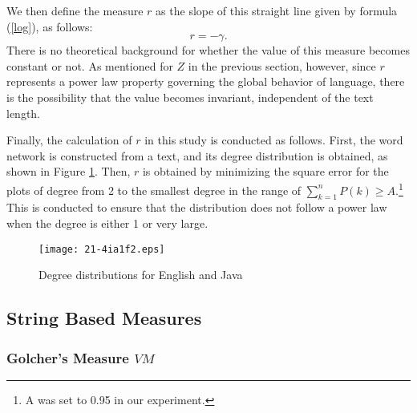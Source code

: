 \documentclass[english]{jnlp_1.4_rep}
\begin{document}
We then define the measure $r$ as the slope of this straight line given by formula (\ref{log}), as follows: 
\begin{equation}
r=-\gamma .           \label {eqr}
\end{equation}
There is no theoretical background for whether the value of this measure becomes constant or not. As mentioned for $Z$ in the previous section, however, since $r$ represents a power law property governing the global behavior of language, there is the possibility that the value becomes invariant,  
independent of the text length.

Finally, the calculation of $r$ in this study is conducted as follows. First, the word network is constructed from a text, and its degree distribution is obtained, as shown in Figure \ref{fig:deg}. Then, $r$ is obtained by minimizing the square error for the plots of degree from 2 to the smallest degree in the range of $\sum_{k=1}^{n}P(k)\geq A$.\footnote{A was set to 0.95 in our experiment.} This is conducted to ensure that the distribution does not follow a power law when the degree is either 1 or very large.

\begin{figure}[t]
\begin{center}
\texttt{[image: 21-4ia1f2.eps]}
\end{center}
\caption{Degree distributions for English and Java}
\label{fig:deg}
\end{figure}


\subsection{String Based Measures}

\subsubsection*{Golcher's Measure $\mathit{VM}$}
\end{document}
